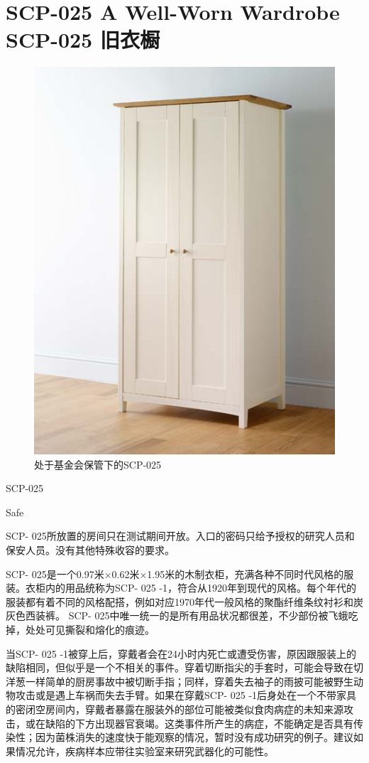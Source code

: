\chapter[SCP-025 旧衣橱]{
    SCP-025 A Well-Worn Wardrobe\\
    SCP-025 旧衣橱
}

\label{chap:SCP-025}

\begin{figure}[H]
    \centering
    \includegraphics[width=0.5\linewidth]{images/SCP-025.jpg}
    \caption*{处于基金会保管下的SCP-025}
\end{figure}

SCP-025

Safe

SCP- 025所放置的房间只在测试期间开放。入口的密码只给予授权的研究人员和保安人员。没有其他特殊收容的要求。

SCP- 025是一个0.97米×0.62米×1.95米的木制衣柜，充满各种不同时代风格的服装。衣柜内的用品统称为SCP- 025 -1，符合从1920年到现代的风格。每个年代的服装都有着不同的风格配搭，例如对应1970年代一般风格的聚酯纤维条纹衬衫和炭灰色西装裤。 SCP- 025中唯一统一的是所有用品状况都很差，不少部份被飞蛾吃掉，处处可见撕裂和熔化的痕迹。

当SCP- 025 -1被穿上后，穿戴者会在24小时内死亡或遭受伤害，原因跟服装上的缺陷相同，但似乎是一个不相关的事件。穿着切断指尖的手套时，可能会导致在切洋葱一样简单的厨房事故中被切断手指；同样，穿着失去袖子的雨披可能被野生动物攻击或是遇上车祸而失去手臂。如果在穿戴SCP- 025 -1后身处在一个不带家具的密闭空房间内，穿戴者暴露在服装外的部位可能被类似食肉病症的未知来源攻击，或在缺陷的下方出现器官衰竭。这类事件所产生的病症，不能确定是否具有传染性；因为菌株消失的速度快于能观察的情况，暂时没有成功研究的例子。建议如果情况允许，疾病样本应带往实验室来研究武器化的可能性。

